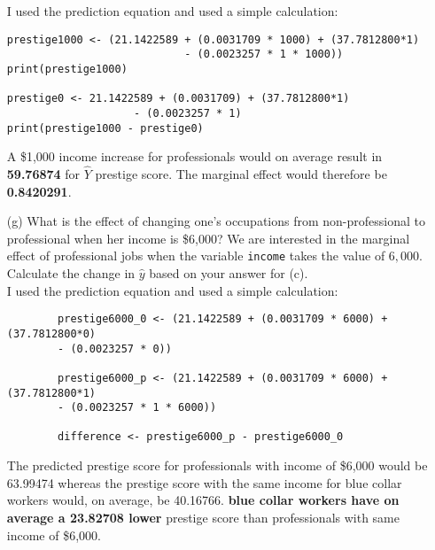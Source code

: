 \documentclass[12pt,letterpaper]{article}
\begin{document}
\begin{enumerate}
I used the prediction equation and used a simple calculation:

\begin{verbatim}
prestige1000 <- (21.1422589 + (0.0031709 * 1000) + (37.7812800*1)
							- (0.0023257 * 1 * 1000))
print(prestige1000)  

prestige0 <- 21.1422589 + (0.0031709) + (37.7812800*1)               
					- (0.0023257 * 1)
print(prestige1000 - prestige0)

\end{verbatim}

A \$1,000 income increase for professionals would on average result in \textbf{59.76874} for $\hat{Y}$ prestige score. The marginal effect would therefore be \textbf{0.8420291}.
	
	\vspace{.5cm}
	
\newpage

	
	\item [(g)]
	What is the effect of changing one's occupations from non-professional to professional when her income is \$6,000? We are interested in the marginal effect of professional jobs when the variable \texttt{income} takes the value of $6,000$. Calculate the change in $\hat{y}$ based on your answer for (c).\\
	
	I used the prediction equation and used a simple calculation:
	\begin{verbatim}
		prestige6000_0 <- (21.1422589 + (0.0031709 * 6000) + (37.7812800*0)                    
		- (0.0023257 * 0))

		prestige6000_p <- (21.1422589 + (0.0031709 * 6000) + (37.7812800*1)                       
		- (0.0023257 * 1 * 6000))
		
		difference <- prestige6000_p - prestige6000_0
	\end{verbatim}

The predicted prestige score for professionals with income of \$6,000 would be 63.99474 whereas the prestige score with the same income for blue collar workers would, on average, be 40.16766.
\textbf{blue collar workers have on average a 23.82708 lower} prestige score than professionals with same income of \$6,000.
	
\end{enumerate}

\newpage
\end{document}
